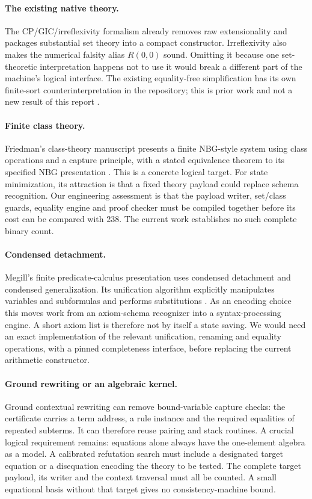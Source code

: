 \paragraph{The existing native theory.}
The CP/GIC/irreflexivity formalism already removes raw extensionality and
packages substantial set theory into a compact constructor.  Irreflexivity
also makes the numerical falsity alias $R(0,0)$ sound.  Omitting it because
one set-theoretic interpretation happens not to use it would break a
different part of the machine's logical interface.  The existing
equality-free simplification has its own finite-sort counterinterpretation
in the repository; this is prior work and not a new result of this report
\cite{typed,upstream}.

\paragraph{Finite class theory.}
Friedman's class-theory manuscript presents a finite NBG-style system using
class operations and a capture principle, with a stated equivalence theorem
to its specified NBG presentation \cite{friedman}.  This is a concrete
logical target.  For state minimization, its attraction is that a fixed
theory payload could replace schema recognition.  Our engineering
assessment is that the payload writer, set/class guards, equality engine
and proof checker must be compiled together before its cost can be compared
with 238.  The current work establishes no such complete binary count.

\paragraph{Condensed detachment.}
Megill's finite predicate-calculus presentation uses condensed detachment
and condensed generalization.  Its unification algorithm explicitly
manipulates variables and subformulas and performs substitutions
\cite{megill}.  As an encoding choice this moves work from an axiom-schema
recognizer into a syntax-processing engine.  A short axiom list is therefore
not by itself a state saving.  We would need an exact implementation of the
relevant unification, renaming and equality operations, with a pinned
completeness interface, before replacing the current arithmetic constructor.

\paragraph{Ground rewriting or an algebraic kernel.}
Ground contextual rewriting can remove bound-variable capture checks:
the certificate carries a term address, a rule instance and the required
equalities of repeated subterms.  It can therefore reuse pairing and stack
routines.  A crucial logical requirement remains: equations alone always
have the one-element algebra as a model.  A calibrated refutation search
must include a designated target equation or a disequation encoding the
theory to be tested.  The complete target payload, its writer and the
context traversal must all be counted.  A small equational basis without
that target gives no consistency-machine bound.

